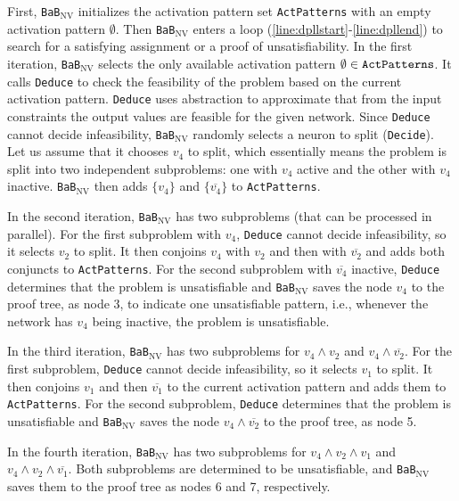 \documentclass[oneside,11pt,dvipsnames]{book}
\newcommand{\functiontextformat}[1]{\textrm{\texttt{#1}}}
\newcommand{\bab}{\texttt{BaB$_{\text{NV}}$}}
\begin{document}
First, \bab{} initializes the activation pattern set \functiontextformat{ActPatterns} with an empty activation pattern $\emptyset$. Then \bab{} enters a loop (\autoref{line:dpllstart}-\autoref{line:dpllend}) to search for a satisfying assignment or a proof of unsatisfiability. In the first iteration, \bab{} selects the only available activation pattern $\emptyset \in \functiontextformat{ActPatterns}$. 
It calls \functiontextformat{Deduce} to check the feasibility of the problem based on the current activation pattern. \functiontextformat{Deduce} uses abstraction to approximate that from the input constraints the output values are feasible for the given network. 
Since \functiontextformat{Deduce} cannot decide infeasibility, \bab{} randomly selects a neuron to split (\functiontextformat{Decide}). Let us assume that it chooses $v_4$ to split, which essentially means the problem is split into two independent subproblems: one with $v_4$ active and the other with $v_4$ inactive.
\bab{} then adds $\{v_4\}$ and $\{\overline{v_4}\}$ to \functiontextformat{ActPatterns}.

In the second iteration, \bab{} has two subproblems (that can be processed in parallel). For the first subproblem with $v_4$, \functiontextformat{Deduce} cannot decide infeasibility, so it selects $v_2$ to split. It then conjoins $v_4$ with $v_2$ and then with $\overline{v_2}$ and adds both conjuncts to \texttt{ActPatterns}. 
For the second subproblem with $\overline{v_4}$ inactive, \functiontextformat{Deduce} determines that the problem is unsatisfiable and \bab{} saves the node $v_4$ to the proof tree, as node 3, to indicate one unsatisfiable pattern, i.e., whenever the network has $v_4$ being inactive, the problem is unsatisfiable.

In the third iteration, \bab{} has two subproblems for $v_4 \land v_2$ and $v_4 \land \overline{v_2}$. For the first subproblem, \functiontextformat{Deduce} cannot decide infeasibility, so it selects $v_1$ to split. It then conjoins $v_1$ and then $\overline{v_1}$ to the current activation pattern and adds them to \functiontextformat{ActPatterns}. For the second subproblem, \functiontextformat{Deduce} determines that the problem is unsatisfiable and \bab{} saves the node $v_4 \land \overline{v_2}$ to the proof tree, as node 5.

In the fourth iteration, \bab{} has two subproblems for $v_4 \land v_2 \land v_1$ and $v_4 \land v_2 \land \overline{v_1}$. Both subproblems are determined to be unsatisfiable, and \bab{} saves them to the proof tree as nodes 6 and 7, respectively.
\end{document}
